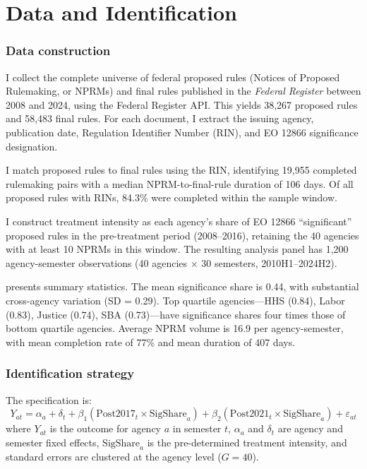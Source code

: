 \documentclass[12pt]{article}
\begin{document}
\section{Data and Identification}

\subsubsection*{Data construction} I collect the complete universe of federal proposed rules (Notices of Proposed Rulemaking, or NPRMs) and final rules published in the \textit{Federal Register} between 2008 and 2024, using the Federal Register API. This yields 38,267 proposed rules and 58,483 final rules. For each document, I extract the issuing agency, publication date, Regulation Identifier Number (RIN), and EO 12866 significance designation.

I match proposed rules to final rules using the RIN, identifying 19,955 completed rulemaking pairs with a median NPRM-to-final-rule duration of 106 days. Of all proposed rules with RINs, 84.3\% were completed within the sample window.

I construct treatment intensity as each agency's share of EO 12866 ``significant'' proposed rules in the pre-treatment period (2008--2016), retaining the 40 agencies with at least 10 NPRMs in this window. The resulting analysis panel has 1,200 agency-semester observations (40 agencies $\times$ 30 semesters, 2010H1--2024H2).

 presents summary statistics. The mean significance share is 0.44, with substantial cross-agency variation (SD = 0.29). Top quartile agencies---HHS (0.84), Labor (0.83), Justice (0.74), SBA (0.73)---have significance shares four times those of bottom quartile agencies. Average NPRM volume is 16.9 per agency-semester, with mean completion rate of 77\% and mean duration of 407 days.



\subsubsection*{Identification strategy} The specification is:
\begin{equation}
Y_{at} = \alpha_a + \delta_t + \beta_1 (\text{Post2017}_t \times \text{SigShare}_a) + \beta_2 (\text{Post2021}_t \times \text{SigShare}_a) + \varepsilon_{at}
\label{eq:main}
\end{equation}
where $Y_{at}$ is the outcome for agency $a$ in semester $t$, $\alpha_a$ and $\delta_t$ are agency and semester fixed effects, $\text{SigShare}_a$ is the pre-determined treatment intensity, and standard errors are clustered at the agency level ($G = 40$).
\end{document}
